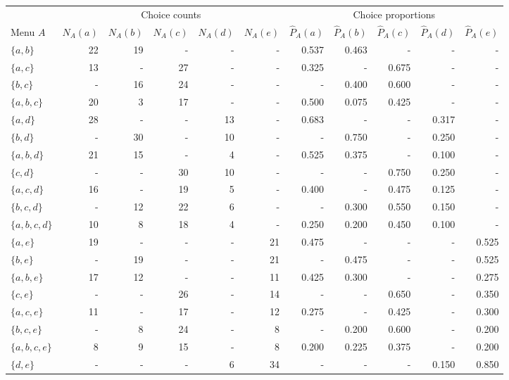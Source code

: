 \documentclass[
]{article}
\begin{document}
\begin{table}\centering

\begin{tabular}{lrrrrrrrrrr}
\toprule
\multicolumn{1}{c}{ } & \multicolumn{5}{c}{Choice counts} & \multicolumn{5}{c}{Choice proportions} \\
\cmidrule(l{3pt}r{3pt}){2-6} \cmidrule(l{3pt}r{3pt}){7-11}
Menu $A$ & $N_A(a)$ & $N_A(b)$ & $N_A(c)$ & $N_A(d)$ & $N_A(e)$ & $\hat P_A(a)$ & $\hat P_A(b)$ & $\hat P_A(c)$ & $\hat P_A(d)$ & $\hat P_A(e)$\\
\midrule
$\{a,b\}$ & 22 & 19 & - & - & - & 0.537 & 0.463 & - & - & -\\
$\{a,c\}$ & 13 & - & 27 & - & - & 0.325 & - & 0.675 & - & -\\
$\{b,c\}$ & - & 16 & 24 & - & - & - & 0.400 & 0.600 & - & -\\
$\{a,b,c\}$ & 20 & 3 & 17 & - & - & 0.500 & 0.075 & 0.425 & - & -\\
$\{a,d\}$ & 28 & - & - & 13 & - & 0.683 & - & - & 0.317 & -\\
\addlinespace
$\{b,d\}$ & - & 30 & - & 10 & - & - & 0.750 & - & 0.250 & -\\
$\{a,b,d\}$ & 21 & 15 & - & 4 & - & 0.525 & 0.375 & - & 0.100 & -\\
$\{c,d\}$ & - & - & 30 & 10 & - & - & - & 0.750 & 0.250 & -\\
$\{a,c,d\}$ & 16 & - & 19 & 5 & - & 0.400 & - & 0.475 & 0.125 & -\\
$\{b,c,d\}$ & - & 12 & 22 & 6 & - & - & 0.300 & 0.550 & 0.150 & -\\
\addlinespace
$\{a,b,c,d\}$ & 10 & 8 & 18 & 4 & - & 0.250 & 0.200 & 0.450 & 0.100 & -\\
$\{a,e\}$ & 19 & - & - & - & 21 & 0.475 & - & - & - & 0.525\\
$\{b,e\}$ & - & 19 & - & - & 21 & - & 0.475 & - & - & 0.525\\
$\{a,b,e\}$ & 17 & 12 & - & - & 11 & 0.425 & 0.300 & - & - & 0.275\\
$\{c,e\}$ & - & - & 26 & - & 14 & - & - & 0.650 & - & 0.350\\
\addlinespace
$\{a,c,e\}$ & 11 & - & 17 & - & 12 & 0.275 & - & 0.425 & - & 0.300\\
$\{b,c,e\}$ & - & 8 & 24 & - & 8 & - & 0.200 & 0.600 & - & 0.200\\
$\{a,b,c,e\}$ & 8 & 9 & 15 & - & 8 & 0.200 & 0.225 & 0.375 & - & 0.200\\
$\{d,e\}$ & - & - & - & 6 & 34 & - & - & - & 0.150 & 0.850\\

\end{tabular}
\end{table}
\end{document}
